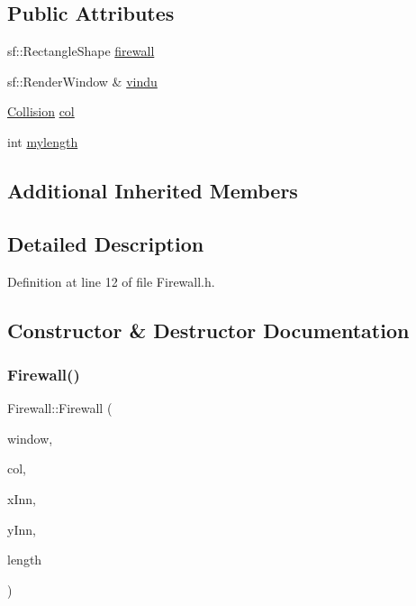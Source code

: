 \subsection*{Public Attributes}
\begin{DoxyCompactItemize}
\item 
sf\+::\+Rectangle\+Shape \hyperlink{class_firewall_aeb0bd3471e4a080461e2c4d9c8e64a4b}{firewall}
\item 
sf\+::\+Render\+Window \& \hyperlink{class_firewall_a65ebc11322740e80e12fec7f0789142d}{vindu}
\item 
\hyperlink{class_collision}{Collision} \hyperlink{class_firewall_af1c215a26c43f1339ca1247f02f0d91e}{col}
\item 
int \hyperlink{class_firewall_ad99a69d3d864a94b406d0dd7711abb73}{mylength}
\end{DoxyCompactItemize}
\subsection*{Additional Inherited Members}


\subsection{Detailed Description}


Definition at line 12 of file Firewall.\+h.



\subsection{Constructor \& Destructor Documentation}
\hypertarget{class_firewall_a77f12236ebbdcc218d03366774aa9aab}{}\label{class_firewall_a77f12236ebbdcc218d03366774aa9aab} 
\subsubsection{\texorpdfstring{Firewall()}{Firewall()}}
{\footnotesize\ttfamily Firewall\+::\+Firewall (\begin{DoxyParamCaption}\item[{sf\+::\+Render\+Window \&}]{window,  }\item[{\hyperlink{class_collision}{Collision}}]{col,  }\item[{int}]{x\+Inn,  }\item[{int}]{y\+Inn,  }\item[{int}]{length }\end{DoxyParamCaption})}

